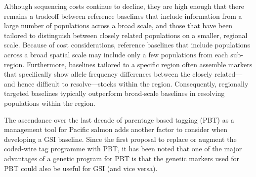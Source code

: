 Although sequencing costs continue to decline, they are high enough
that there remains a tradeoff
between reference baselines that include information from a large number of
populations across a broad scale, and those that have been tailored
to distinguish between closely related populations on a smaller, regional scale.
Because of cost considerations, reference baselines that include populations across a broad 
spatial scale may include only a few populations from each sub-region.  Furthermore,
baselines tailored to a specific region often assemble markers that specifically
show allele frequency differences between the closely related---and hence difficult
to resolve---stocks within the region.  Consequently, regionally targeted baselines typically
outperform broad-scale baselines in resolving populations within the region.

The ascendance over the last decade of parentage based tagging (PBT) as a management
tool for Pacific salmon adds another factor to consider when developing a GSI baseline.
Since the first proposal \citep{anderson2005description} to replace or augment the coded-wire tag
programme \citep{nandor2010overview}
with PBT, it has been noted that one of the major advantages of a genetic program for
PBT is that the genetic markers used for PBT could also be useful for GSI (and
vice versa).
 
 
